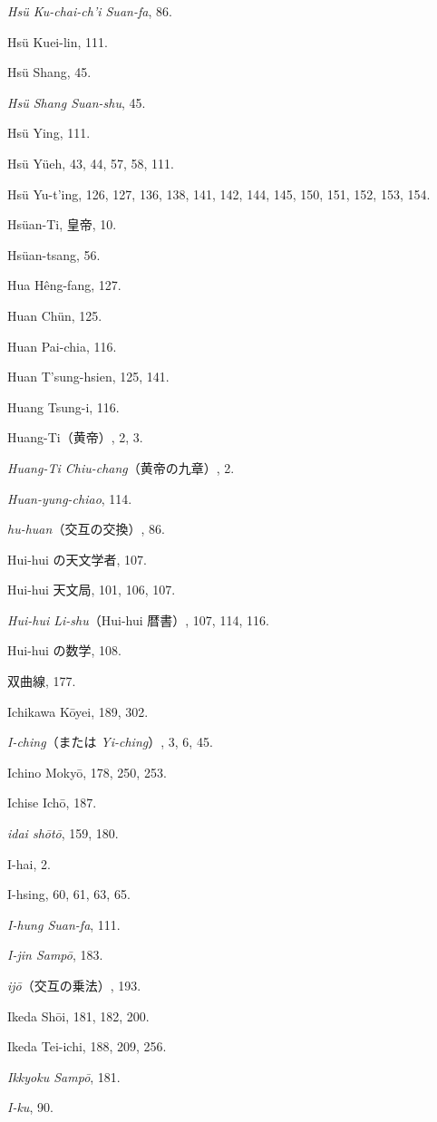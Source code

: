\documentclass[11pt]{article}
\begin{document}
\emph{Hsü Ku-chai-ch'i Suan-fa}, 86.\par
Hsü Kuei-lin, 111.\par
Hsü Shang, 45.\par
\emph{Hsü Shang Suan-shu}, 45.\par
Hsü Ying, 111.\par
Hsü Yüeh, 43, 44, 57, 58, 111.\par
Hsü Yu-t'ing, 126, 127, 136, 138, 141, 142, 144, 145, 150, 151, 152, 153, 154.\par
Hsüan-Ti, 皇帝, 10.\par
Hsüan-tsang, 56.\par
Hua Hêng-fang, 127.\par
Huan Chün, 125.\par
Huan Pai-chia, 116.\par
Huan T'sung-hsien, 125, 141.\par
Huang Tsung-i, 116.\par
Huang-Ti（黄帝）, 2, 3.\par
\emph{Huang-Ti Chiu-chang}（黄帝の九章）, 2.\par
\emph{Huan-yung-chiao}, 114.\par
\emph{hu-huan}（交互の交換）, 86.\par
Hui-hui の天文学者, 107.\par
Hui-hui 天文局, 101, 106, 107.\par
\emph{Hui-hui Li-shu}（Hui-hui 暦書）, 107, 114, 116.\par
Hui-hui の数学, 108.\par
双曲線, 177.\par
\medskip
Ichikawa Kōyei, 189, 302.\par
\emph{I-ching}（または \emph{Yi-ching}）, 3, 6, 45.\par
Ichino Mokyō, 178, 250, 253.\par
Ichise Ichō, 187.\par
\emph{idai shōtō}, 159, 180.\par
I-hai, 2.\par
I-hsing, 60, 61, 63, 65.\par
\emph{I-hung Suan-fa}, 111.\par
\emph{I-jin Sampō}, 183.\par
\emph{ijō}（交互の乗法）, 193.\par
Ikeda Shōi, 181, 182, 200.\par
Ikeda Tei-ichi, 188, 209, 256.\par
\emph{Ikkyoku Sampō}, 181.\par
\emph{I-ku}, 90.\par
\end{document}
